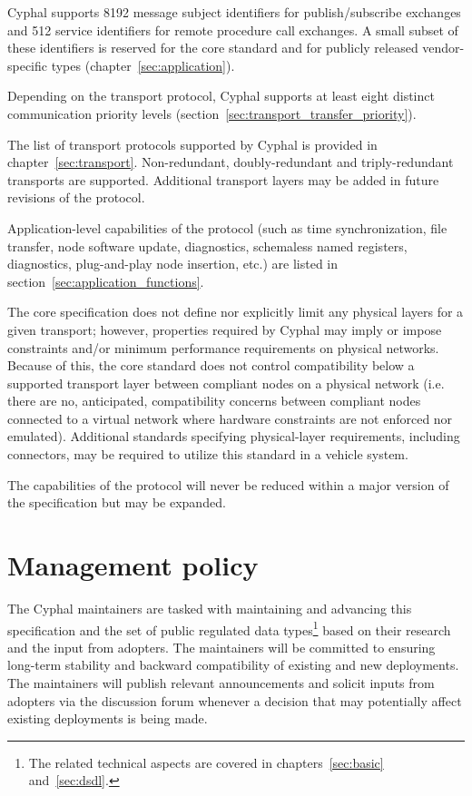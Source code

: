 Cyphal supports 8192 message subject identifiers for publish/subscribe exchanges and
512 service identifiers for remote procedure call exchanges.
A small subset of these identifiers is reserved for the core standard and for publicly released vendor-specific types
(chapter~\ref{sec:application}).

Depending on the transport protocol, Cyphal supports at least eight distinct communication priority levels
(section~\ref{sec:transport_transfer_priority}).

The list of transport protocols supported by Cyphal is provided in chapter~\ref{sec:transport}.
Non-redundant, doubly-redundant and triply-redundant transports are supported.
Additional transport layers may be added in future revisions of the protocol.

Application-level capabilities of the protocol (such as time synchronization, file transfer,
node software update, diagnostics, schemaless named registers, diagnostics, plug-and-play node insertion, etc.)
are listed in section~\ref{sec:application_functions}.

The core specification does not define nor explicitly limit any physical layers for a given transport; however,
properties required by Cyphal may imply or impose constraints and/or minimum performance requirements on physical
networks. Because of this, the core standard does not control compatibility below a supported transport layer between
compliant nodes on a physical network (i.e. there are no, anticipated, compatibility concerns between compliant nodes
connected to a virtual network where hardware constraints are not enforced nor emulated).
Additional standards specifying physical-layer requirements, including connectors,
may be required to utilize this standard in a vehicle system.

The capabilities of the protocol will never be reduced within a major version of the specification but may be expanded.

\section{Management policy}

The Cyphal maintainers are tasked with maintaining and advancing this specification and
the set of public regulated data types\footnote{%
    The related technical aspects are covered in chapters~\ref{sec:basic} and~\ref{sec:dsdl}.
} based on their research and the input from adopters.
The maintainers will be committed to ensuring long-term stability and backward compatibility of
existing and new deployments.
The maintainers will publish relevant announcements and solicit inputs from adopters
via the discussion forum whenever a decision that may potentially affect existing deployments is being made.


